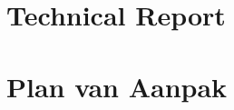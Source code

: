 \documentclass[a4paper,11pt]{book}
\begin{document}






\mainmatter













\appendix
\chapter{Technical Report}



\chapter{Plan van Aanpak}



\backmatter
\printindex
\end{document}

